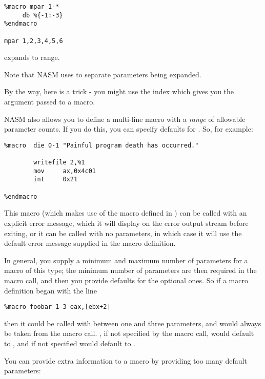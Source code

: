 \begin{lstlisting}
%macro mpar 1-*
     db %{-1:-3}
%endmacro

mpar 1,2,3,4,5,6
\end{lstlisting}

expands to  range.

Note that NASM uses  to separate parameters being expanded.

By the way, here is a trick - you might use the index 
which gives you the  argument passed to a macro.


NASM also allows you to define a multi-line macro with a \emph{range}
of allowable parameter counts. If you do this, you can specify
defaults for . So, for example:

\begin{lstlisting}
%macro  die 0-1 "Painful program death has occurred."

        writefile 2,%1
        mov     ax,0x4c01
        int     0x21

%endmacro
\end{lstlisting}

This macro (which makes use of the  macro defined in
) can be called with an explicit error message,
which it will display on the error output stream before exiting, or it can be
called with no parameters, in which case it will use the default
error message supplied in the macro definition.

In general, you supply a minimum and maximum number of parameters
for a macro of this type; the minimum number of parameters are then
required in the macro call, and then you provide defaults for the
optional ones. So if a macro definition began with the line

\begin{lstlisting}
%macro foobar 1-3 eax,[ebx+2]
\end{lstlisting}

then it could be called with between one and three parameters, and
 would always be taken from the macro call. , if not
specified by the macro call, would default to , and 
if not specified would default to \code{[ebx+2]}.

You can provide extra information to a macro by providing
too many default parameters:

